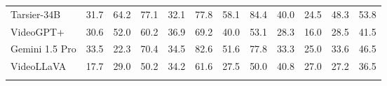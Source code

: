 \begin{table}[t]
\begin{adjustbox}{width=\columnwidth}
\begin{tabular}{lcccccccccc>{\columncolor{gray!10}}c}
{Tarsier-34B} & 31.7     & 64.2     & 77.1 & 32.1       & 77.8 & 58.1    & 84.4 & 40.0   & 24.5     & 48.3   & 53.8 \\ 
VideoGPT+ & 30.6     & 52.0     & 60.2 & 36.9       & 69.2 & 40.0    & 53.1 & 28.3   & 16.0     & 28.5  & 41.5  \\
Gemini 1.5 Pro & 33.5     & 22.3     & 70.4 & 34.5       & 82.6 & 51.6    & 77.8 & 33.3   & 25.0     & 33.6   & 46.5 \\
\midrule
\arrayrulecolor{gray!50}
\hdashline
\rowcolor[HTML]{F2F3F4} 
VideoLLaVA & 17.7 & 29.0 & 50.2 & 34.2 & 61.6 & 27.5 & 50.0 & 40.8 & 27.0 & 27.2 & 36.5 \\
\hdashline
\arrayrulecolor{black}

\end{tabular}
\end{adjustbox}
\end{table}
